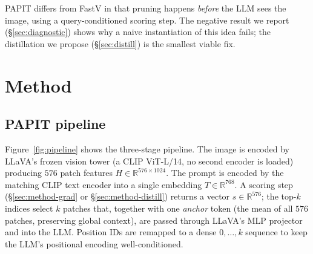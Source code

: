 \documentclass[10pt,twocolumn,letterpaper]{article}
\begin{document}
PAPIT differs from FastV in that pruning happens \emph{before} the LLM
sees the image, using a query-conditioned scoring step. The negative
result we report (\S\ref{sec:diagnostic}) shows why a naive instantiation
of this idea fails; the distillation we propose (\S\ref{sec:distill})
is the smallest viable fix.

\section{Method}
\label{sec:method}

\subsection{PAPIT pipeline}
\label{sec:method-pipeline}

Figure~\ref{fig:pipeline} shows the three-stage pipeline. The image is
encoded by LLaVA's frozen vision tower (a CLIP ViT-L/14, no second
encoder is loaded) producing $576$ patch features $H{\in}\mathbb{R}^{576\times1024}$.
The prompt is encoded by the matching CLIP text encoder into a single
embedding $T{\in}\mathbb{R}^{768}$. A scoring step (\S\ref{sec:method-grad}
or \S\ref{sec:method-distill}) returns a vector $s{\in}\mathbb{R}^{576}$;
the top-$k$ indices select $k$ patches that, together with one
\emph{anchor} token (the mean of all $576$ patches, preserving global
context), are passed through LLaVA's MLP projector and into the LLM.
Position IDs are remapped to a dense $0,\dots,k$ sequence to keep the
LLM's positional encoding well-conditioned.
\end{document}
